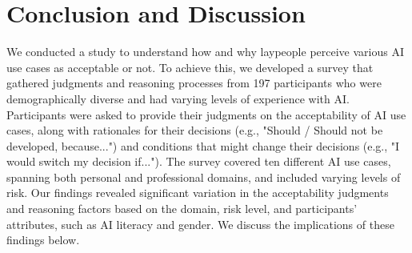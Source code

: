 \section{Conclusion and Discussion}

We conducted a study to understand how and why laypeople perceive various AI use cases as acceptable or not. To achieve this, we developed a survey that gathered judgments and reasoning processes from 197 participants who were demographically diverse and had varying levels of experience with AI. Participants were asked to provide their judgments on the acceptability of AI use cases, along with rationales for their decisions (e.g., "Should / Should not be developed, because...") and conditions that might change their decisions (e.g., "I would switch my decision if..."). The survey covered ten different AI use cases, spanning both personal and professional domains, and included varying levels of risk. Our findings revealed significant variation in the acceptability judgments and reasoning factors based on the domain, risk level, and participants' attributes, such as AI literacy and gender. We discuss the implications of these findings below. 

